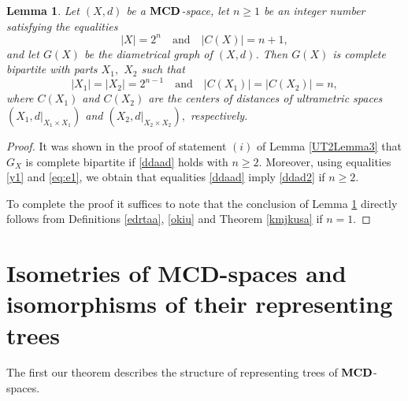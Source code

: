 \documentclass{raex}
\newtheorem{lem}[thm]{Lemma}
\theoremstyle{definition}
\theoremstyle{remark}
\numberwithin{equation}{section}
\begin{document}
\begin{lem}
    \label{lemlem}
Let $(X,d)$ be a ${\bf MCD}$-space, let $n\geq 1$ be an
integer number satisfying the equalities
\begin{equation}
    \label{ddaad}
|X|=2^n \quad\text{and}\quad |C(X)|=n+1,
\end{equation}
and let $G(X)$ be the diametrical graph of $(X,d)$. Then
$G(X)$ is complete bipartite with parts $X_1,$ $X_2$ such that
\begin{equation}
    \label{ddad2}
|X_1|=|X_2|=2^{n-1}
\quad\text{and}\quad
|C(X_1)|=|C(X_2)|=n,
\end{equation}
where \(C(X_1)\) and \(C(X_2)\) are the centers of distances of ultrametric spaces
\(
(X_1,d|_{X_1\times X_1})\) and \(
(X_2,d|_{X_2\times X_2}),
\)
respectively.
\end{lem}

\begin{proof}
It was shown in the proof of statement $(i)$  of Lemma \ref{UT2Lemma3} that
\(G_X\) is complete bipartite if \eqref{ddaad} holds with $n\geq2$.
Moreover, using equalities  \eqref{y1} and \eqref{eq:e1}, we obtain that equalities
\eqref{ddaad} imply \eqref{ddad2} if \(n\geq 2\).

To complete the proof it suffices to note that the conclusion of Lemma \ref{lemlem}
directly follows from Definitions \ref{edrtaa}, \ref{okiu} and Theorem \ref{kmjkusa} if \(n=1\).
\end{proof}




\section{Isometries of {\bf MCD}-spaces and isomorphisms of their representing trees }\label{seq4}




The first our theorem describes the structure of representing trees
of $\bf MCD$-spaces.
\end{document}
